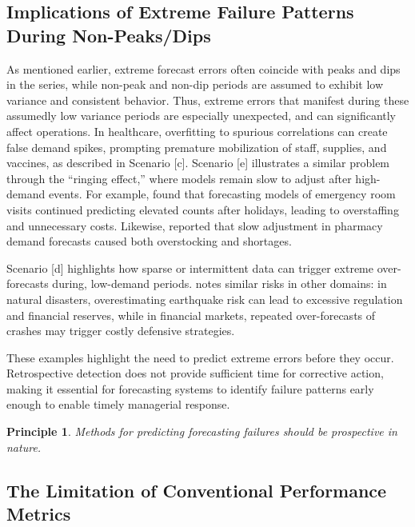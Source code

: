 \documentclass[ijds,sglanonrev]{informs4}
\newtheorem{principle}{Principle}
\begin{document}
\subsection{Implications of Extreme Failure Patterns During Non-Peaks/Dips}

As mentioned earlier, extreme forecast errors often coincide with peaks and dips in the series, while non-peak and non-dip periods are assumed to exhibit low variance and consistent behavior. Thus, extreme errors that manifest during these assumedly low variance periods are especially unexpected, and can significantly affect operations. In healthcare, overfitting to spurious correlations can create false demand spikes, prompting premature mobilization of staff, supplies, and vaccines, as described in Scenario [c]. Scenario [e] illustrates a similar problem through the “ringing effect,” where models remain slow to adjust after high-demand events. For example, \citet{Burkom2007} found that forecasting models of emergency room visits continued predicting elevated counts after holidays, leading to overstaffing and unnecessary costs. Likewise, \citet{lopez2014} reported that slow adjustment in pharmacy demand forecasts caused both overstocking and shortages.

Scenario [d] highlights how sparse or intermittent data can trigger extreme over-forecasts during, low-demand periods. \citet{nikolopoulos2021} notes similar risks in other domains: in natural disasters, overestimating earthquake risk can lead to excessive regulation and financial reserves, while in financial markets, repeated over-forecasts of crashes may trigger costly defensive strategies.

These examples highlight the need to predict extreme errors before they occur. Retrospective detection does not provide sufficient time for corrective action, making it essential for forecasting systems to identify failure patterns early enough to enable timely managerial response.

\begin{principle}
\textit{Methods for predicting forecasting failures should be prospective in nature.}
\end{principle}

\subsection{The Limitation of Conventional Performance Metrics}
\end{document}
